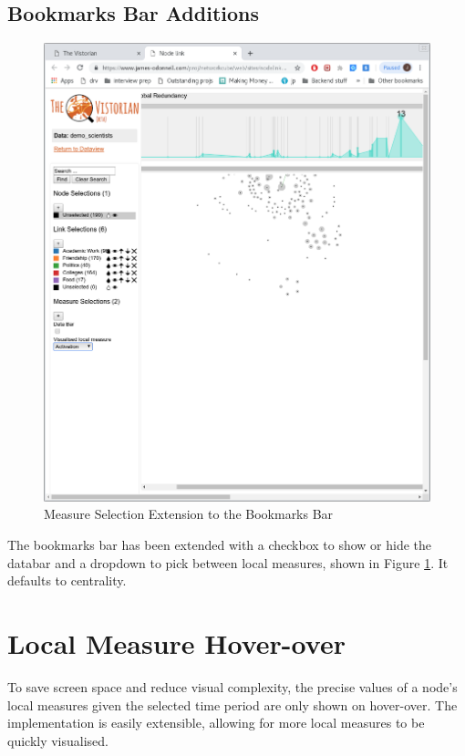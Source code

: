 \subsection{Bookmarks Bar Additions}
\begin{figure}
  \begin{center}
  \includegraphics[trim={0, 12cm, 20cm, 22cm},clip, width=140mm]{./Figures/bookmarksbar.png}
  \caption{Measure Selection Extension to the Bookmarks Bar }
  \label{fig:bookmarksbar}
  \end{center}
\end{figure}

The bookmarks bar has been extended with a checkbox to show or hide the databar and a dropdown to pick between local measures, shown in Figure \ref{fig:bookmarksbar}. It defaults to centrality.

\section{Local Measure Hover-over}
\label{sec:localMeasureVis}
To save screen space and reduce visual complexity, the precise values of a node's local measures given the selected time period are only shown on hover-over. The implementation is easily extensible, allowing for more local measures to be quickly visualised.

